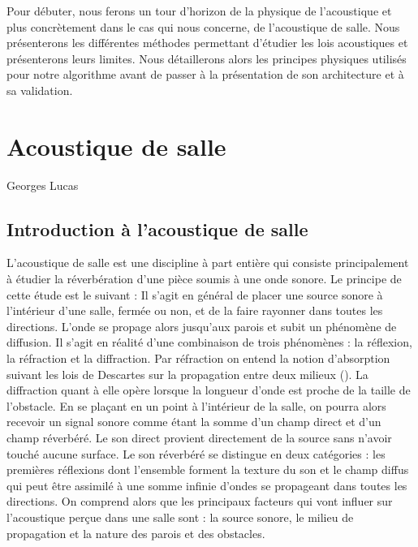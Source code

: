 Pour débuter, nous ferons un tour d'horizon de la physique de l'acoustique et plus concrètement dans le cas qui nous concerne, de l'acoustique de salle. Nous présenterons les différentes méthodes permettant d'étudier les lois acoustiques et présenterons leurs limites. Nous détaillerons alors les principes physiques utilisés pour notre algorithme avant de passer à la présentation de son architecture et à sa validation.


\chapter{Acoustique de salle}
			{Georges Lucas}
		\minitoc
		\newpage
		
\section{Introduction à l'acoustique de salle}
L'acoustique de salle est une discipline à part entière qui consiste principalement à étudier la réverbération d'une pièce soumis à une onde sonore. Le principe de cette étude est le suivant : Il s'agit en général de placer une source sonore à l'intérieur d'une salle, fermée ou non, et de la faire rayonner dans toutes les directions. L'onde se propage alors jusqu'aux parois et subit un phénomène de diffusion. Il s'agit en réalité d'une combinaison de trois phénomènes : la réflexion, la réfraction et la diffraction. Par réfraction on entend la notion d'absorption suivant les lois de Descartes sur la propagation entre deux milieux (\cite{jouhaneau}). La diffraction quant à elle opère lorsque la longueur d'onde est proche de la taille de l'obstacle. En se plaçant en un point à l'intérieur de la salle, on pourra alors recevoir un signal sonore comme étant la somme d'un champ direct et d’un champ réverbéré. Le son direct provient directement de la source sans n'avoir touché aucune surface. Le son réverbéré se distingue en deux catégories : les premières réflexions dont l'ensemble forment la texture du son et le champ diffus qui peut être assimilé à une somme infinie d'ondes se propageant dans toutes les directions. 
On comprend alors que les principaux facteurs qui vont influer sur l'acoustique perçue dans une salle sont : la source sonore, le milieu de propagation et la nature des parois et des obstacles.

